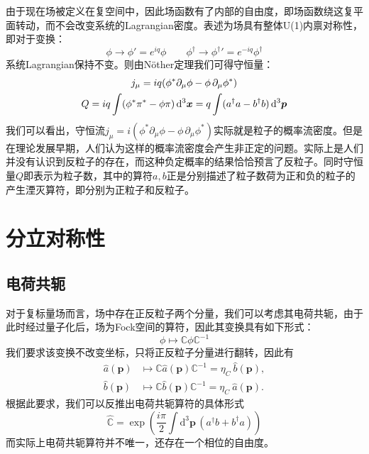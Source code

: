 由于现在场被定义在复空间中，因此场函数有了内部的自由度，即场函数绕这复平面转动，而不会改变系统的Lagrangian密度。表述为场具有整体U(1)内禀对称性，即对于变换：
\begin{equation}
\phi\rightarrow\phi'=e^{iq}\phi \qquad
\phi^{\dagger}\rightarrow{\phi^{\dagger}}'=e^{-iq}\phi^{\dagger}
\end{equation}
系统Lagrangian保持不变。则由N\"other定理我们可得守恒量：
\begin{gather}
j_\mu=iq(\phi^*\partial_\mu\phi-\phi\,\partial_\mu\phi^*)\notag\\
Q=iq \int(\phi^*\pi^*-\phi\pi)\,\mathrm{d}^3\boldsymbol{x}=q\int(a^{\dagger}a-b^{\dagger}b)\,\mathrm{d}^3\boldsymbol{p}
\end{gather}
我们可以看出，守恒流$j_\mu=i(\phi^*\partial_\mu\phi-\phi\,\partial_\mu\phi^*)$实际就是粒子的概率流密度。但是在理论发展早期，人们认为这样的概率流密度会产生非正定的问题。实际上是人们并没有认识到反粒子的存在，而这种负定概率的结果恰恰预言了反粒子。同时守恒量$Q$即表示为粒子数，其中的算符$a,b$正是分别描述了粒子数荷为正和负的粒子的产生湮灭算符，即分别为正粒子和反粒子。

\section{分立对称性}
\subsection*{电荷共轭}
对于复标量场而言，场中存在正反粒子两个分量，我们可以考虑其电荷共轭，由于此时经过量子化后，场为Fock空间的算符，因此其变换具有如下形式：
\begin{equation}
    \phi \mapsto \mathbb{C}\phi\mathbb{C}^{-1}
\end{equation}
我们要求该变换不改变坐标，只将正反粒子分量进行翻转，因此有
\begin{align}
    \hat{a}(\boldsymbol{p}) &\mapsto \mathbb{C}\hat{a}(\boldsymbol{p})\mathbb{C}^{-1} = \eta_C~\hat{b}(\boldsymbol{p}),\\
    \hat{b}(\boldsymbol{p}) &\mapsto \mathbb{C}\hat{b}(\boldsymbol{p})\mathbb{C}^{-1} = \eta_C~\hat{a}(\boldsymbol{p}).
\end{align}
根据此要求，我们可以反推出电荷共轭算符的具体形式
\begin{equation}
    \hat{\mathbb{C}} = \exp\left( \frac{i\pi}{2}\int\mathrm{d}^3\boldsymbol{p}\,(a^\dagger b + b^\dagger a) \right)
\end{equation}
而实际上电荷共轭算符并不唯一，还存在一个相位的自由度。

